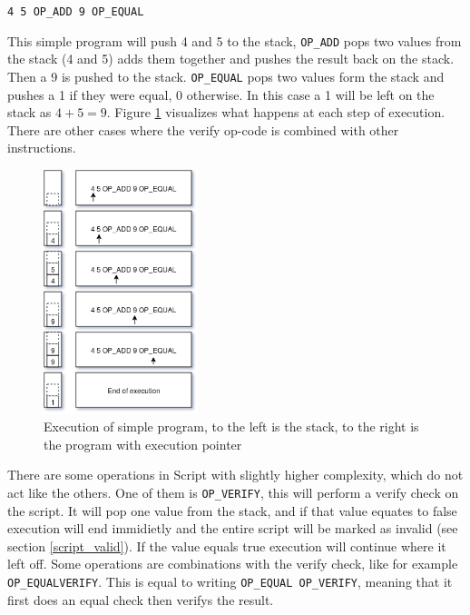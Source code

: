 \texttt{4 5 OP\_ADD 9 OP\_EQUAL}

This simple program will push 4 and 5 to the stack, \texttt{OP\_ADD}\cite{script_wiki} pops two values from the stack (4 and 5) adds them together and pushes the result back on the stack. Then a 9 is pushed to the stack. \texttt{OP\_EQUAL}\cite{script_wiki} pops two values form the stack and pushes a 1 if they were equal, 0 otherwise. In this case a 1 will be left on the stack as $4 + 5 = 9$. Figure \ref{fig:script} visualizes what happens at each step of execution. There are other cases where the verify op-code is combined with other instructions.
\\
\begin{figure}[H]
	\centering
	\includegraphics[width=0.4\textwidth]{background/images/script.png}
	\caption{Execution of simple program, to the left is the stack, to the right is the program with execution pointer}
	\label{fig:script}
\end{figure}


There are some operations in Script with slightly higher complexity, which do not act like the others. One of them is \texttt{OP\_VERIFY}, this will perform a verify check on the script. It will pop one value from the stack, and if that value equates to false execution will end immidietly and the entire script will be marked as invalid (see section \ref{script_valid}).\cite{antonopoulos_2017}\cite{script_wiki} If the value equals true execution will continue where it left off. Some operations are combinations with the verify check, like for example \texttt{OP\_EQUALVERIFY}. This is equal to writing \texttt{OP\_EQUAL OP\_VERIFY}, meaning that it first does an equal check then verifys the result.

